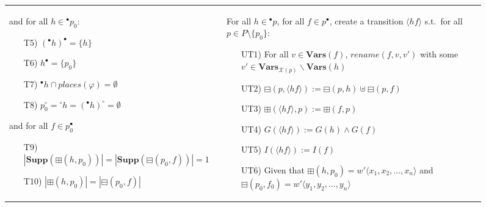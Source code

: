 \begin{figure}[h!]
\begin{adjustbox}{center}
\begin{tabular}{|p{70mm}|p{70mm}|}
\begin{itemize}[leftmargin=9mm]
        \end{itemize}
        \hspace{2mm}
        and for all $h\in{}^\bullet p_0$:
        \begin{itemize}[leftmargin=9mm]
            \item[T5)] $(^\bullet h)^\bullet = \{h\}$
            \item[T6)] $h^\bullet=\{p_0\}$
            \item[T7)] ${}^\bullet h \cap places(\varphi) = \emptyset$
            \item[T8)] $p_0^\circ = {}^\circ h = ({}^\bullet h)^\circ = \emptyset$
        \end{itemize}
        \hspace{2mm}
        and for all $f\in p_0^\bullet$
        \begin{itemize}[leftmargin=11mm]
            \item[T9)] $|\textbf{Supp}(\boxplus(h, p_0))| = |\textbf{Supp}(\boxminus(p_0, f))| = 1$
            \item[T10)] $|\boxplus(h, p_0)| = |\boxminus(p_0,f)|$
        \end{itemize}
        &
        For all $h\in{}^\bullet p$, for all $f\in p^\bullet$, create a transition $\langle hf\rangle$ s.t.\ for all $p\in P\setminus\{p_0\}$:
        \begin{itemize}[leftmargin=10mm]
            \item[UT1)] For all $v \in\textbf{Vars}(f)$, $rename(f,v,v')$ with some $v' \in\textbf{Vars}_{\mathcal{X}(p)}\backslash\textbf{Vars}(h)$
            \item[UT2)] $\boxminus(p,\langle hf\rangle) := \boxminus(p,h)\uplus\boxminus(p,f)$
            \item[UT3)] $\boxplus(\langle hf\rangle,p) := \boxplus(f,p)$
            \item[UT4)] $G(\langle hf\rangle) := G(h) \land G(f)$
            \item[UT5)] $I(\langle hf\rangle) := I(f)$
            \item[UT6)] Given that $\boxplus(h,p_0) = w{}'\langle x_1, x_2, \dots, x_n \rangle$ and $\boxminus(p_0, f_0) = w{}'\langle y_1, y_2, \dots, y_n \rangle$\newline

\end{itemize}
\end{tabular}
\end{adjustbox}
\end{figure}
